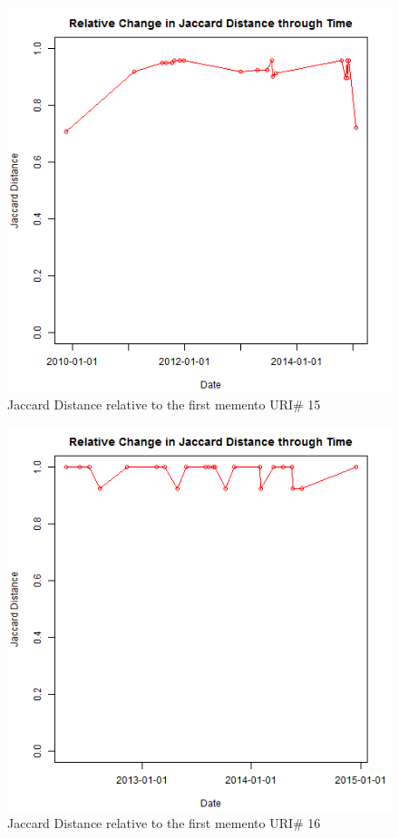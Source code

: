 \begin{figure}[ht]
	\begin{center}
		 \includegraphics[scale=0.60]{url15}
		  \caption{Jaccard Distance relative to the first memento URI\# 15}
	 \end{center}
\end{figure}
\begin{figure}[ht]
	\begin{center}
		 \includegraphics[scale=0.60]{url16}
		  \caption{Jaccard Distance relative to the first memento URI\# 16}
	 \end{center}
\end{figure}
